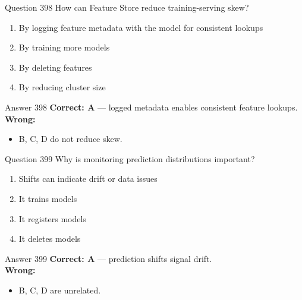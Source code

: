 \documentclass[aspectratio=169,11pt]{beamer}
\begin{document}
	\begin{frame}{Question 398}
		How can Feature Store reduce training-serving skew?
		\begin{enumerate}[label=\Alph*.]
			\item By logging feature metadata with the model for consistent lookups
			\item By training more models
			\item By deleting features
			\item By reducing cluster size
		\end{enumerate}
	\end{frame}
	\begin{frame}{Answer 398}
		\textbf{Correct: A} --- logged metadata enables consistent feature lookups.\\
		\vspace{0.5em}
		\textbf{Wrong:}
		\begin{itemize}
			\item B, C, D do not reduce skew.
		\end{itemize}
	\end{frame}
	
	\begin{frame}{Question 399}
		Why is monitoring prediction distributions important?
		\begin{enumerate}[label=\Alph*.]
			\item Shifts can indicate drift or data issues
			\item It trains models
			\item It registers models
			\item It deletes models
		\end{enumerate}
	\end{frame}
	\begin{frame}{Answer 399}
		\textbf{Correct: A} --- prediction shifts signal drift.\\
		\vspace{0.5em}
		\textbf{Wrong:}
		\begin{itemize}
			\item B, C, D are unrelated.
		\end{itemize}
	\end{frame}
	
\end{document}
